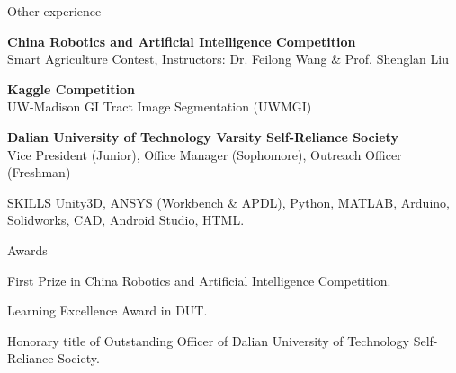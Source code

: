 \documentclass{resume} %
\begin{document}
\begin{rSection}{Other experience}

\begin{rSubsection}{}{}
	{}{}
\item {{\bf China Robotics and Artificial Intelligence Competition}\\ Smart Agriculture Contest, Instructors: Dr. Feilong Wang \& Prof. Shenglan Liu}\\

\item {{\bf Kaggle Competition}\\UW-Madison GI Tract Image Segmentation (UWMGI)}\\

\item {{\bf Dalian University of Technology Varsity Self-Reliance Society}\\Vice President (Junior), Office Manager (Sophomore), Outreach Officer (Freshman)}\\
\end{rSubsection}

\end{rSection}
\newpage

\begin{rSection}{SKILLS}
	Unity3D, ANSYS (Workbench $\&$ APDL), Python, MATLAB, Arduino, Solidworks, CAD, Android Studio, HTML.  \\
\end{rSection}

\vspace{-1em}

\begin{rSection}{Awards}

\begin{rSubsection}{}{}
{}{}
  \item {First Prize in China Robotics and Artificial Intelligence Competition.}\\
  \item {Learning Excellence Award in DUT.}\\
  \item {Honorary title of Outstanding Officer of Dalian University of Technology Self-Reliance Society.}\\
\end{rSubsection}
\end{rSection}
\end{document}
